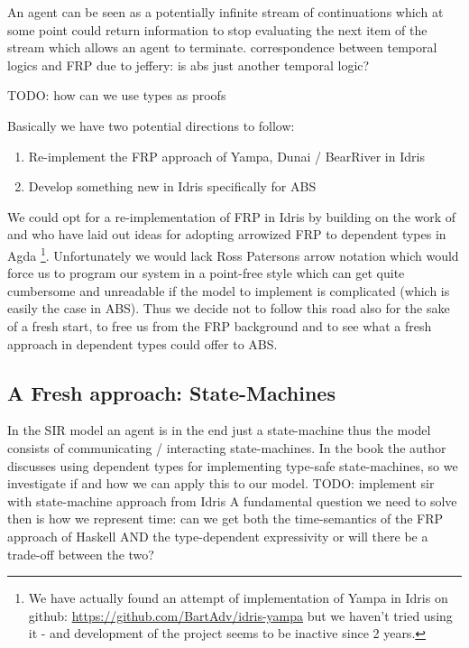 An agent can be seen as a potentially infinite stream of continuations which at some point could return information to stop evaluating the next item of the stream which allows an agent to terminate.
correspondence between temporal logics and FRP due to jeffery: is abs just another temporal logic?

TODO: how can we use types as proofs

Basically we have two potential directions to follow:
\begin{enumerate}
	\item Re-implement the FRP approach of Yampa, Dunai / BearRiver in Idris
	\item Develop something new in Idris specifically for ABS
\end{enumerate}

We could opt for a re-implementation of FRP in Idris by building on the work of \cite{sculthorpe_safe_2009} and \cite{jeffrey_causality_2013} who have laid out ideas for adopting arrowized FRP to dependent types in Agda \footnote{We have actually found an attempt of implementation of Yampa in Idris on github: \url{https://github.com/BartAdv/idris-yampa} but we haven't tried using it - and development of the project seems to be inactive since 2 years.}. Unfortunately we would lack Ross Patersons \cite{paterson_new_2001} arrow notation which would force us to program our system in a point-free style which can get quite cumbersome and unreadable if the model to implement is complicated (which is easily the case in ABS). Thus we decide not to follow this road also for the sake of a fresh start, to free us from the FRP background and to see what a fresh approach in dependent types could offer to ABS.

\subsection{A Fresh approach: State-Machines}
In the SIR model an agent is in the end just a state-machine thus the model consists of communicating / interacting state-machines. In the book \cite{brady_type-driven_2017} the author discusses using dependent types for implementing type-safe state-machines, so we investigate if and how we can apply this to our model.
TODO: implement sir with state-machine approach from Idris
A fundamental question we need to solve then is how we represent time: can we get both the time-semantics of the FRP approach of Haskell AND the type-dependent expressivity or will there be a trade-off between the two?

